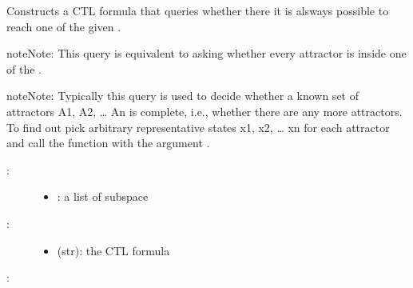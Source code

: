 \documentclass[letterpaper,10pt,english]{sphinxmanual}
\begin{document}
\begin{fulllineitems}
\label{\detokenize{QueryPatterns:PyBoolNet.QueryPatterns.AGEF_oneof_subspaces}}
Constructs a CTL formula that queries whether there it is alsways possible to reach one of the given .

\begin{sphinxadmonition}{note}{Note:}
This query is equivalent to asking whether every attractor is inside one of the .
\end{sphinxadmonition}

\begin{sphinxadmonition}{note}{Note:}
Typically this query is used to decide whether a known set of attractors A1, A2, … An is complete, i.e., whether there are any more attractors.
To find out pick arbitrary representative states x1, x2, … xn for each attractor and call the function  with the argument .
\end{sphinxadmonition}
\begin{description}
\item[{:}] \leavevmode\begin{itemize}
\item {} 
: a list of subspace

\end{itemize}

\item[{:}] \leavevmode\begin{itemize}
\item {} 
 (str): the CTL formula

\end{itemize}

\end{description}

:

\begin{sphinxVerbatim}[commandchars=\\\{\}]
  \PYG{p}{[}\PYG{p}{]}
\end{sphinxVerbatim}

\end{fulllineitems}
\end{document}
